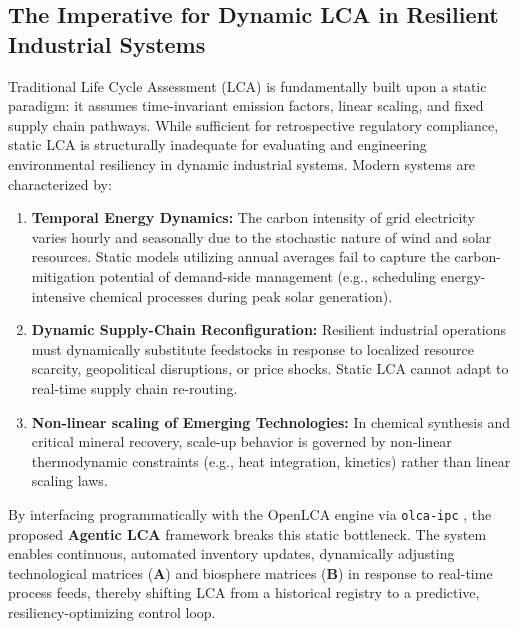 \documentclass[11pt]{article}
\begin{document}
\subsection{The Imperative for Dynamic LCA in Resilient Industrial Systems}
Traditional Life Cycle Assessment (LCA) is fundamentally built upon a static paradigm: it assumes time-invariant emission factors, linear scaling, and fixed supply chain pathways. While sufficient for retrospective regulatory compliance, static LCA is structurally inadequate for evaluating and engineering environmental resiliency in dynamic industrial systems. Modern systems are characterized by:
\begin{enumerate}
    \item \textbf{Temporal Energy Dynamics:} The carbon intensity of grid electricity varies hourly and seasonally due to the stochastic nature of wind and solar resources. Static models utilizing annual averages fail to capture the carbon-mitigation potential of demand-side management (e.g., scheduling energy-intensive chemical processes during peak solar generation).
    \item \textbf{Dynamic Supply-Chain Reconfiguration:} Resilient industrial operations must dynamically substitute feedstocks in response to localized resource scarcity, geopolitical disruptions, or price shocks. Static LCA cannot adapt to real-time supply chain re-routing.
    \item \textbf{Non-linear scaling of Emerging Technologies:} In chemical synthesis and critical mineral recovery, scale-up behavior is governed by non-linear thermodynamic constraints (e.g., heat integration, kinetics) rather than linear scaling laws.
\end{enumerate}
By interfacing programmatically with the OpenLCA engine via \texttt{olca-ipc} \cite{openlca}, the proposed \textbf{Agentic LCA} framework breaks this static bottleneck. The system enables continuous, automated inventory updates, dynamically adjusting technological matrices ($\mathbf{A}$) and biosphere matrices ($\mathbf{B}$) in response to real-time process feeds, thereby shifting LCA from a historical registry to a predictive, resiliency-optimizing control loop.
\end{document}
